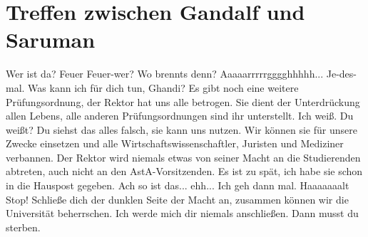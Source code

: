 
\newpage
\section{Treffen zwischen Gandalf und Saruman}
\label{sec:gandalf-saruman}
    \charaktere{\Gandalf, \Saruman }
    

\begin{verseplay}[10em]
\s{\Saruman} Wer ist da?
\s{\Gandalf} Feuer
\s{\Saruman} Feuer-wer?
\s{\Gandalf}  Wo brennts denn?
\s{\Saruman} Aaaaarrrrrgggghhhhh... 
\s{\Saruman} Je-des-mal. Was kann ich für dich tun, Ghandi?
\s{\Gandalf} Es gibt noch eine weitere Prüfungsordnung, der Rektor hat uns alle betrogen. Sie dient der Unterdrückung allen Lebens, alle anderen Prüfungsordnungen sind ihr unterstellt.
\s{\Saruman} Ich weiß.
\s{\Gandalf}  Du weißt?
\s{\Saruman} Du siehst das alles falsch, sie kann uns nutzen. Wir können sie für unsere Zwecke einsetzen und alle Wirtschaftswissenschaftler, Juristen und Mediziner verbannen.
\s{\Gandalf} Der Rektor wird niemals etwas von seiner Macht an die Studierenden abtreten, auch nicht an den AstA-Vorsitzenden.
\s{\Saruman} Es ist zu spät, ich habe sie schon in die Hauspost gegeben.
\s{\Gandalf} Ach so ist das... ehh... Ich geh dann mal.
\s{\Saruman} Haaaaaaalt Stop! Schließe dich der dunklen Seite der Macht an, zusammen können wir die Universität beherrschen.
\s{\Gandalf} Ich werde mich dir niemals anschließen.
\s{\Saruman} Dann musst du sterben.


\end{verseplay}
